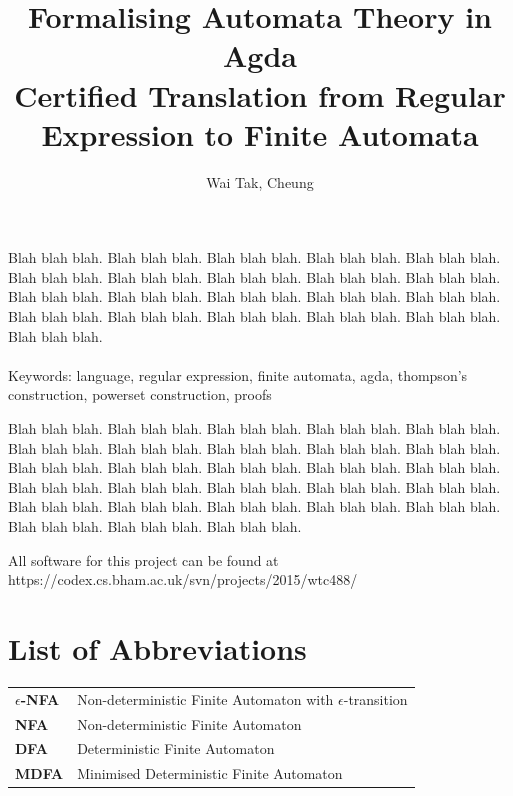\documentclass[twoside,openright,final]{bhamthesis}
\title{\textbf{Formalising Automata Theory in Agda} \\ Certified Translation from Regular Expression to Finite Automata}
\author{Wai Tak, Cheung}
\begin{document}
\maketitle

\abstract
\par Blah blah blah. Blah blah blah. Blah blah blah. Blah blah blah. Blah
blah blah. Blah blah blah. Blah blah blah. Blah blah blah.
Blah blah blah. Blah blah blah. Blah blah blah. Blah blah blah. Blah
blah blah.
Blah blah blah. Blah blah blah. Blah blah blah. Blah blah blah.
Blah blah blah. Blah blah blah. Blah blah blah. Blah blah blah. \\ \\
Keywords: language, regular expression, finite automata, agda,
thompson's construction, powerset construction, proofs

\acknowledgments
\par Blah blah blah. Blah blah blah. Blah blah blah. Blah blah blah. Blah
blah blah. Blah blah blah. Blah blah blah.
Blah blah blah. Blah blah blah. Blah blah blah.
Blah blah blah. Blah blah blah. Blah blah blah. Blah blah blah. Blah
blah blah. Blah blah blah. Blah blah blah.
Blah blah blah. Blah blah blah. Blah blah blah. Blah blah blah. Blah
blah blah. Blah blah blah.
Blah blah blah. Blah blah blah. Blah blah blah. Blah blah blah. Blah
blah blah.

\repository
\vspace{7cm}
\begin{center}
  All software for this project can be found at \\
  https://codex.cs.bham.ac.uk/svn/projects/2015/wtc488/
\end{center}

\newpage
\section*{List of Abbreviations}
\begin{tabular}{ll}
  \textbf{\(\epsilon\)-NFA} & Non-deterministic Finite Automaton with
                              \(\epsilon\)-transition \\
  \textbf{NFA} & Non-deterministic Finite Automaton \\
  \textbf{DFA} & Deterministic Finite Automaton \\
  \textbf{MDFA} & Minimised Deterministic Finite Automaton
\end{tabular}
\newpage

\newpage
\setcounter{tocdepth}{3}
\tableofcontents
\newpage
\end{document}

